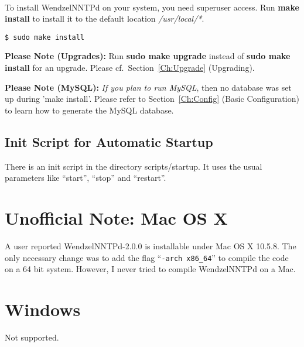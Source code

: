 ~

To install WendzelNNTPd on your system, you need superuser access. Run \textbf{make install} to install it to the default location \textit{/usr/local/*}.

\begin{verbatim}
$ sudo make install
\end{verbatim}

\textbf{Please Note (Upgrades):} Run \textbf{sudo make upgrade} instead of \textbf{sudo make install} for an upgrade. Please cf.\ Section~\ref{Ch:Upgrade} (Upgrading).

\textbf{Please Note (MySQL):} \textit{If you plan to run MySQL}, then no database was set up during 'make install'. Please refer to Section~\ref{Ch:Config} (Basic Configuration) to learn how to generate the MySQL database.

\subsection{Init Script for Automatic Startup}

There is an init script in the directory scripts/startup. It uses the usual parameters like ``start'', ``stop'' and ``restart''.

\section{Unofficial Note: Mac OS X}

A user reported WendzelNNTPd-2.0.0 is installable under Mac OS X 10.5.8. The only necessary change was to add the flag ``\texttt{-arch x86\_64}'' to compile the code on a 64 bit system. However, I never tried to compile WendzelNNTPd on a Mac.

\section{Windows}

Not supported.


